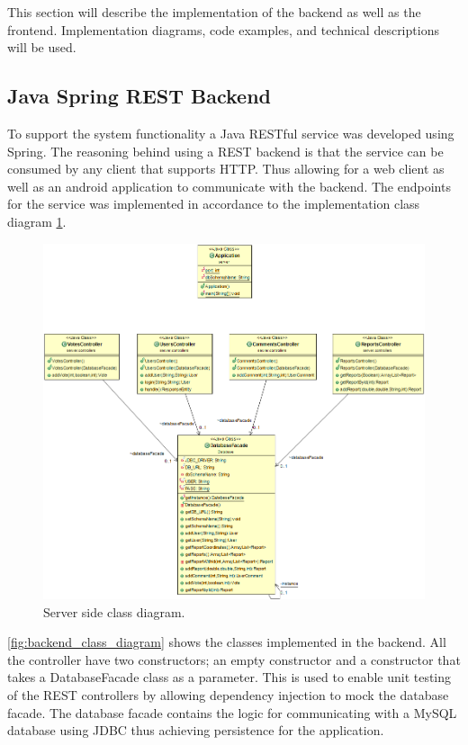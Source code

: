 
This section will describe the implementation of the backend as well as the frontend. Implementation diagrams, code examples, and technical descriptions will be used. 

\subsection{Java Spring REST Backend}
To support the system functionality a Java RESTful service was developed using Spring. The reasoning behind using a REST backend is that the service can be consumed by any client that supports HTTP. Thus allowing for a web client as well as an android application to communicate with the backend. The endpoints for the service was implemented in accordance to the implementation class diagram \ref{fig:backend_class_diagram}. 

\begin{figure}[hbt]
\centering
\includegraphics[width=\linewidth]{images/Class_backend_diagram}
\caption{Server side class diagram.}\label{fig:backend_class_diagram}
\end{figure}

\autoref{fig:backend_class_diagram} shows the classes implemented in the backend. All the controller have two constructors; an empty constructor and a constructor that takes a DatabaseFacade class as a parameter. This is used to enable unit testing of the REST controllers by allowing dependency injection to mock the database facade. The database facade contains the logic for communicating with a MySQL database using JDBC thus achieving persistence for the application. 

